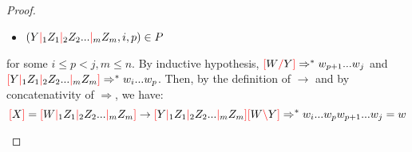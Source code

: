 \documentclass[main.tex]{subfiles}
\begin{document}
\begin{proof}
\begin{enumerate}
\begin{itemize}
                \item $(Y \textcolor{red}{|}_1 Z_1 \textcolor{red}{|}_2 Z_2 ... \textcolor{red}{|}_m Z_m, i, p) \in P$
            \end{itemize}
            for some $i \leq p < j, m \leq n$. By inductive hypothesis,
            $\textcolor{red}{[} W \textcolor{red}{/} Y \textcolor{red}{]} \Rightarrow^* w_{p + 1} ... w_j$
            and
            $\textcolor{red}{[} Y \textcolor{red}{|}_1 Z_1 \textcolor{red}{|}_2 Z_2 ... \textcolor{red}{|}_m Z_m \textcolor{red}{]} \Rightarrow^* w_i ... w_p$.
            Then, by the definition of $\rightarrow$ and by concatenativity of
            $\Rightarrow$, we have:
            \[
                \textcolor{red}{[} X \textcolor{red}{]} = \textcolor{red}{[} W \textcolor{red}{|}_1 Z_1 \textcolor{red}{|}_2 Z_2 ... \textcolor{red}{|}_m Z_m \textcolor{red}{]}
                \rightarrow
                \textcolor{red}{[} Y \textcolor{red}{|}_1 Z_1 \textcolor{red}{|}_2 Z_2 ... \textcolor{red}{|}_m Z_m \textcolor{red}{]} \textcolor{red}{[} W \textcolor{red}{\backslash} Y \textcolor{red}{]}
                \Rightarrow^*
                w_i ... w_p w_{p + 1} ... w_j = w
            \]
    \end{enumerate}
\end{proof}
\end{document}
